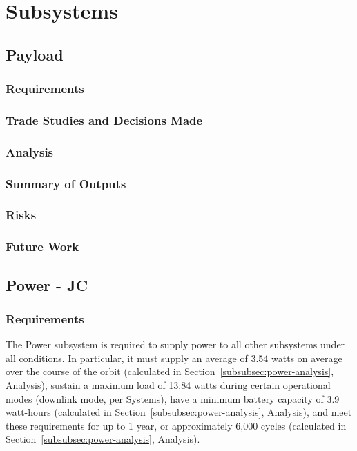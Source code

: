 \documentclass[12pt]{article}
\begin{document}
\section{Subsystems}
		\subsection{Payload}
			\subsubsection{Requirements}
			\subsubsection{Trade Studies and Decisions Made}
			\subsubsection{Analysis}
			\subsubsection{Summary of Outputs}
			\subsubsection{Risks}
			\subsubsection{Future Work}
		\subsection{Power - JC}
			\subsubsection{Requirements}
			The Power subsystem is required to supply power to all other subsystems under all conditions.  In particular, it must supply an average of 3.54 watts on average over the course of the orbit (calculated in Section~\ref{subsubsec:power-analysis}, Analysis), sustain a maximum load of 13.84 watts during certain operational modes (downlink mode, per Systems), have a minimum battery capacity of 3.9 watt-hours (calculated in Section~\ref{subsubsec:power-analysis}, Analysis), and meet these requirements for up to 1 year, or approximately 6,000 cycles (calculated in Section~\ref{subsubsec:power-analysis}, Analysis).
			
\end{document}
